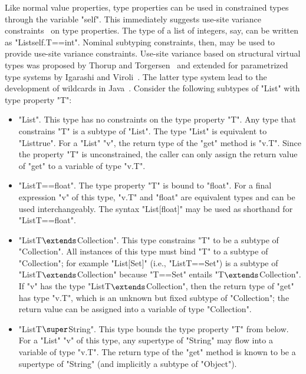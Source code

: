 Like normal value properties, type properties
can be used in constrained types through the variable \xcd"self".
%
This immediately suggests use-site variance
constraints~\cite{unifying-genericity,variant-parametric-types}
on type properties.
The type of a list of integers, say, can be written as
\xcd"List{self.T==int}".  
Nominal subtyping constraints, then, may be used to
provide use-site variance constraints.
Use-site variance based on structural virtual types was proposed by
Thorup and Torgersen~\cite{unifying-genericity} and extended for
parametrized type systems by Igarashi and
Viroli~\cite{variant-parametric-types}.  The latter type system lead
to the development of wildcards in
Java~\cite{Java3,adding-wildcards,wildcards-safe}.  
%
Consider the following subtypes of \xcd"List" with type property
\xcd"T":
\begin{itemize}
\item \xcd"List".  This type has no constraints on the type
property \xcd"T".
Any type that constrains \xcd"T"
is a subtype of \xcd"List".  The type \xcd"List" is equivalent to
\xcd"List{true}".
%
For a \xcd"List" \xcd"v", the return type of the \xcd"get" method
is \xcd"v.T".
Since the property \xcd"T" is unconstrained,
the caller can only assign the return value of \xcd"get"
to a variable of type \xcd"v.T".

\item \xcd"List{T==float}".
The type property \xcd"T" is bound to \xcd"float".
For a final expression \xcd"v" of this type,
\xcd"v.T" and \xcd"float" are equivalent types and can be used
interchangeably.
The syntax \xcd"List[float]" may be used as
shorthand for \xcd"List{T==float}".

\item \xcdmath"List{T$\extends$Collection}".
This type constrains \xcd"T" to be a subtype of \xcd"Collection".
All instances of this type must bind \xcd"T" to a subtype of
\xcd"Collection"; for example \xcd"List[Set]" (i.e.,
\xcd"List{T==Set}") is a subtype of
\xcdmath"List{T$\extends$Collection}" because \xcd"T==Set" entails
\xcdmath"T$\extends$Collection".
%
If \xcd"v" has the type \xcdmath"List{T$\extends$Collection}",
then the return type of \xcd"get" has type \xcd"v.T", which is an unknown but
fixed subtype of \xcd"Collection"; the return value can be
assigned into a variable of type \xcd"Collection".

\item \xcdmath"List{T$\super$String}".  This type bounds the type property
\xcd"T"
from below.  For a \xcd"List" \xcd"v" of this type, any
supertype of \xcd"String" may flow into a variable of type \xcd"v.T".
The return type of the \xcd"get"
method is known to be a
supertype of \xcd"String" (and implicitly a subtype of \xcd"Object").
\end{itemize}

